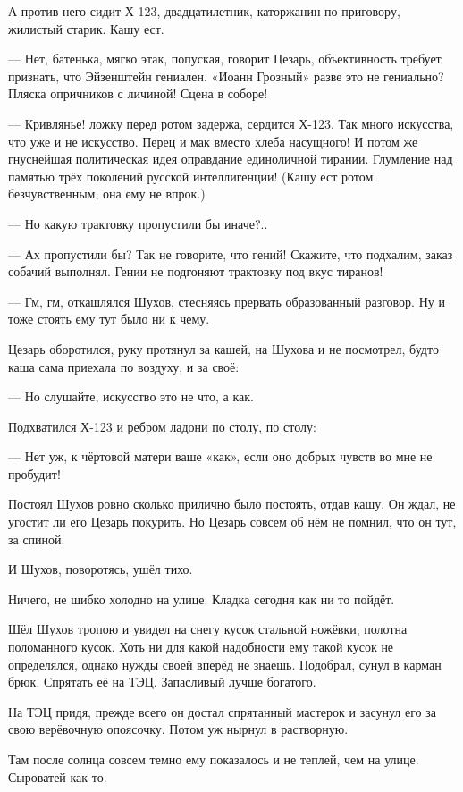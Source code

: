 А против него сидит Х-123, двадцатилетник, каторжанин по приговору, жилистый старик. Кашу ест.

--- Нет, батенька, \dash мягко этак, попуская, говорит Цезарь, \Dash объективность требует признать,
что Эйзенштейн гениален. «Иоанн Грозный» \dash разве это не гениально? Пляска опричников с
личиной! Сцена в соборе!

--- Кривлянье! \dash ложку перед ротом задержа, сердится Х-123. \Dash Так много искусства, что уже и не
искусство. Перец и мак вместо хлеба насущного! И потом же гнуснейшая политическая идея \dash
оправдание единоличной тирании. Глумление над памятью трёх поколений русской
интеллигенции! \dash (Кашу ест ротом безчувственным, она ему не впрок.)

--- Но какую трактовку пропустили бы иначе?..

--- Ах пропустили бы? Так не говорите, что гений! Скажите, что подхалим, заказ собачий выполнял.
Гении не подгоняют трактовку под вкус тиранов!

--- Гм, гм, \dash откашлялся Шухов, стесняясь прервать образованный разговор. Ну и тоже стоять ему
тут было ни к чему.

Цезарь оборотился, руку протянул за кашей, на Шухова и не посмотрел, будто каша сама приехала
по воздуху, \dash и за своё:

--- Но слушайте, искусство \dash это не что, а как.

Подхватился Х-123 и ребром ладони по столу, по столу:

--- Нет уж, к чёртовой матери ваше «как», если оно добрых чувств во мне не пробудит!

Постоял Шухов ровно сколько прилично было постоять, отдав кашу. Он ждал, не угостит ли его
Цезарь покурить. Но Цезарь совсем об нём не помнил, что он тут, за спиной.

И Шухов, поворотясь, ушёл тихо.

Ничего, не шибко холодно на улице. Кладка сегодня как ни то пойдёт.

Шёл Шухов тропою и увидел на снегу кусок стальной ножёвки, полотна поломанного кусок. Хоть
ни для какой надобности ему такой кусок не определялся, однако нужды своей вперёд не знаешь.
Подобрал, сунул в карман брюк. Спрятать её на ТЭЦ. Запасливый лучше богатого.

На ТЭЦ придя, прежде всего он достал спрятанный мастерок и засунул его за свою верёвочную
опоясочку. Потом уж нырнул в растворную.

Там после солнца совсем темно ему показалось и не теплей, чем на улице. Сыроватей как-то.

